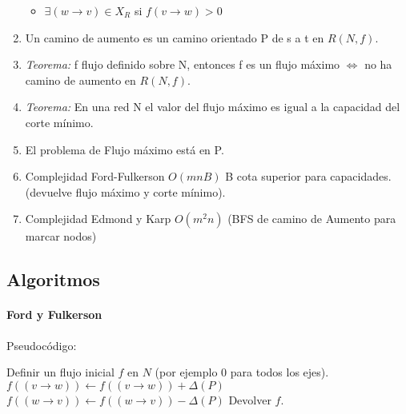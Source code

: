 \begin{enumerate}
\begin{itemize}
        \item $\exists (w\rightarrow v)\in X_{R}$ si $f(v\rightarrow w)> 0$
    \end{itemize}
\item Un camino de aumento es un camino orientado P de s a t en $R(N,f)$.
\item \textit{Teorema:} f flujo definido sobre N, entonces f es un flujo máximo $\iff$ no ha camino de aumento en $R(N,f)$.
\item \textit{Teorema:} En una red N el valor del flujo máximo es igual a la capacidad del corte mínimo.
\item El problema de Flujo máximo está en P.
\item Complejidad Ford-Fulkerson $O(mnB)$ B cota superior para capacidades. (devuelve flujo máximo y corte mínimo).
\item Complejidad Edmond y Karp $O(m^{2}n)$ (BFS de camino de Aumento para marcar nodos)
\end{enumerate}

\subsection{Algoritmos}
\paragraph{Ford y Fulkerson}

Pseudocódigo:
\begin{algorithmic}[1]
    \State Definir un flujo inicial $f$ en $N$ (por ejemplo 0 para todos los ejes).
                \State $f((v\to w)) \gets f((v\to w)) + \Delta(P)$
            \Else
                \State $f((w\to v)) \gets f((w\to v)) - \Delta(P)$
            \EndIf
        \EndFor
    \EndWhile
    \State \Return Devolver $f$.
\end{algorithmic}
